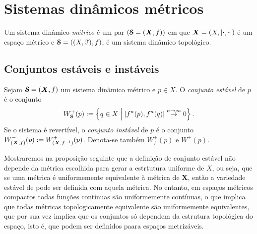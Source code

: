\chapter{Sistemas dinâmicos métricos}


\begin{definition}
Um sistema dinâmico \emph{métrico} é um par $(\bm{\mathcal{S}}=(\bm X,f))$ em que $\bm X = (X,\left\vert{\bm{\cdot}},{\bm{\cdot}}\right\vert)$ é um espaço métrico e $\bm{\mathcal{S}}=((X,\mathcal{T}),f)$, é um sistema dinâmico topológico.
\end{definition}

\section{Conjuntos estáveis e instáveis}

\begin{definition}
Sejam $\bm{\mathcal{S}}=(\bm X,f)$ um sistema dinâmico métrico e $p \in X$. O \emph{conjunto estável} de $p$ é o conjunto
	\begin{equation*}
	W^+_{\bm {\mathcal{S}}}(p) := \left\{{q \in X}\;\middle\vert\;{\left\vert{f^n(p)},{f^n(q)}\right\vert \overset{n \rightarrow \infty}{\to} 0}\right\}.
	\end{equation*}
Se o sistema é revertível, o \emph{conjunto instável} de $p$ é o conjunto $W^-_{(\bm X,f)}(p) := W^+_{(\bm X,f^{-1})}(p)$. Denota-se também $W^+_f(p)$ e $W^+(p)$.
\end{definition}

Mostraremos na proposição seguinte que a definição de conjunto estável não depende da métrica escolhida para gerar a estrtutura uniforme de $X$, ou seja, que se uma métrica é uniformemente equivalente à métrica de $\bm X$, então a variedade estável de pode ser definida com aquela métrica. No entanto, em espaços métricos compactos todas funções contínuas são uniformemente contínuas, o que implica que todas métricas topologicamente equivalente são uniformemente equivalentes, que por sua vez implica que os conjuntos só dependem da estrutura topológica do espaço, isto é, que podem ser definidos paara espaços metrizáveis.

